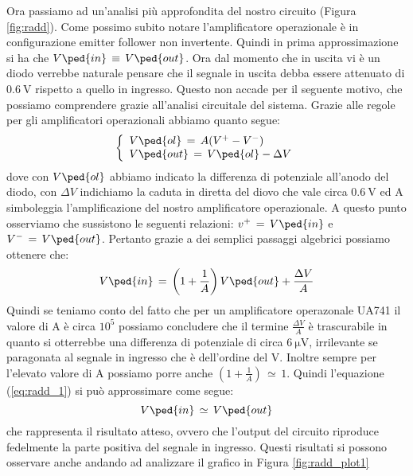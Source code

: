 Ora passiamo ad un'analisi più approfondita del nostro circuito (Figura \ref{fig:radd}). Come possimo subito notare l'amplificatore operazionale è in configurazione emitter follower non invertente. Quindi in prima approssimazione si ha che $V\ped{in}\,\equiv\,V\ped{out}$. Ora dal momento che in uscita vi è un diodo verrebbe naturale pensare che il segnale in uscita debba essere attenuato di $\SI{0.6}{\volt}$ rispetto a quello in ingresso. Questo non accade per il seguente motivo, che possiamo comprendere grazie all'analisi circuitale del sistema. Grazie alle regole per gli amplificatori operazionali abbiamo quanto segue:
\begin{equation}
        \left\{
                \begin{array}{l l}
                        V\ped{ol}\,=\,A(V^+ - V^-)\\
                        V\ped{out}\,=\,V\ped{ol}-\Delta V
                \end{array}
         \right.
         \label{eq:radd_1}
\end{equation}
dove con $V\ped{ol}$ abbiamo indicato la differenza di potenziale all'anodo del diodo, con $\Delta V$ indichiamo la caduta in diretta del diovo che vale circa $\SI{0.6}{\volt}$ ed A simboleggia l'amplificazione del nostro amplificatore operazionale.
A questo punto osserviamo che sussistono le seguenti relazioni: $v^+\,=\,V\ped{in}$ e $V^-\,=\,V\ped{out}$. Pertanto grazie a dei semplici passaggi algebrici possiamo ottenere che:
\begin{equation}
        V\ped{in}\,=\,\left(1+\frac{1}{A}\right)V\ped{out} + \frac{\Delta V}{A}
\end{equation}
Quindi se teniamo conto del fatto che per un amplificatore operazonale UA741 il valore di A è circa $10^5$ possiamo concludere che il termine $\frac{\Delta V}{A}$ è trascurabile in quanto si otterrebbe una differenza di potenziale di circa $\SI{6}{\micro\volt}$, irrilevante se paragonata al segnale in ingresso che è dell'ordine del $\si{\volt}$. Inoltre sempre per l'elevato valore di A possiamo porre anche $\left(1+\frac{1}{A}\right)\,\simeq\,1$. Quindi l'equazione (\ref{eq:radd_1}) si può approssimare come segue:
\begin{equation}
        V\ped{in}\,\simeq\,V\ped{out}
        \label{eq:radd_2}
\end{equation}
che rappresenta il risultato atteso, ovvero che l'output del circuito riproduce fedelmente la parte positiva del segnale in ingresso.
Questi risultati si possono osservare anche andando ad analizzare il grafico in Figura \ref{fig:radd_plot1}

